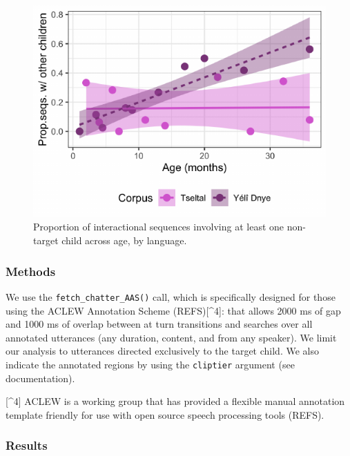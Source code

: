 \documentclass[10pt, letterpaper]{article}
\newenvironment{CodeChunk}{}{}
\begin{document}
\begin{CodeChunk}
\begin{figure}[h!]

{\centering \includegraphics{figs/tseyel.is.fig-1} 

}

\caption[Proportion of interactional sequences involving at least one non-target child across age, by language]{Proportion of interactional sequences involving at least one non-target child across age, by language.}\label{fig:tseyel.is.fig}
\end{figure}
\end{CodeChunk}

\hypertarget{methods}{%
\subsubsection{Methods}\label{methods}}

We use the \texttt{fetch\_chatter\_AAS()} call, which is specifically
designed for those using the ACLEW Annotation Scheme (REFS){[}\^{}4{]}:
that allows 2000 ms of gap and 1000 ms of overlap between at turn
transitions and searches over all annotated utterances (any duration,
content, and from any speaker). We limit our analysis to utterances
directed exclusively to the target child. We also indicate the annotated
regions by using the \texttt{cliptier} argument (see documentation).

{[}\^{}4{]} ACLEW is a working group that has provided a flexible manual
annotation template friendly for use with open source speech processing
tools (REFS).

\hypertarget{results}{%
\subsubsection{Results}\label{results}}
\end{document}
